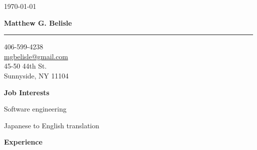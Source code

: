 \documentclass[10pt, a4paper]{article}
\begin{document}
\thispagestyle{empty}
\begin{flushright}
\small \today
\end{flushright}
\begin{center}
\textbf{\Large Matthew G. Belisle}
\rule{\linewidth}{0.5mm}
\end{center}
\begin{flushright}
\begin{minipage}[h]{0.25\linewidth}\small
\begin{flushleft}
406-599-4238\\
\href{mailto:mgbelisle@gmail.com}{mgbelisle@gmail.com}\\
45-50 44th St.\\
Sunnyside, NY 11104
\end{flushleft}
\end{minipage}
\end{flushright}
\textbf{Job Interests}
\begin{itemize*}
  \item Software engineering
  \item Japanese to English translation
\end{itemize*}
\textbf{Experience}
\end{document}
